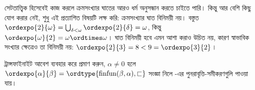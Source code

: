 \documentclass[../../../include/open-logic-section]{subfiles}
\begin{document}
সেটতাত্ত্বিক হিসেবেই কাজ করলে ক্রমসংখ্যার ঘাতের আরও
ধর্ম অনুসন্ধান করতে চাইতে পারি। কিন্তু আর বেশি কিছু
যোগ করার নেই, শুধু এই প্রত্যাশিত বিষয়টি লক্ষ করি:
ক্রমসংখ্যার ঘাত বিনিময়ী নয়। বস্তুত
$\ordexpo{2}{\omega} =
\bigcup_{\delta < \omega}\ordexpo{2}{\delta} = \omega$,
কিন্তু $\ordexpo{\omega}{2} = \omega \ordtimes \omega$।
ঘাত বিনিময়ী হবে এমন আশা করাও উচিত নয়, কারণ
স্বাভাবিক সংখ্যার ক্ষেত্রেও তা বিনিময়ী নয়:
$\ordexpo{2}{3} = 8 < 9 = \ordexpo{3}{2}$।

\begin{prob}
ট্রান্সফাইনাইট আবেশ ব্যবহার করে প্রমাণ করুন,
$\alpha \neq 0$ হলে
$\ordexpo{\alpha}{\beta} =
\ordtype{\text{finfun}(\beta, \alpha), \sqsubset}$
সংজ্ঞা নিলে -এর
পুনরাবৃত্তি-সমীকরণগুলি পাওয়া যায়।
\end{prob}
\end{document}

